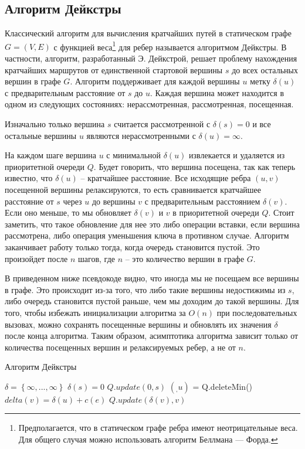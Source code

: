 \subsection{Алгоритм Дейкстры}
Классический алгоритм для вычисления кратчайших путей в статическом графе $G=(V, E)$ с функцией веса\footnote{Предполагается, что в статическом графе ребра имеют неотрицательные веса. Для общего случая можно использовать алгоритм Беллмана — Форда.} для ребер называется алгоритмом Дейкстры. В частности, алгоритм, разработанный Э. Дейкстрой, решает проблему нахождения кратчайших маршрутов от единственной стартовой вершины $s$ до всех остальных вершин в графе $G$. Алгоритм поддерживает для каждой вершины $u$ метку $\delta(u)$ с предварительным расстояние от $s$ до $u$. Каждая вершина может находится в одном из следующих состояниях: нерассмотренная, рассмотренная, посещенная. 

Изначально только вершина $s$ считается рассмотренной с $\delta(s)=0$ и все остальные вершины $u$ являются нерассмотренными с $\delta(u)=\infty$.

На каждом шаге вершина $u$ с минимальной $\delta(u)$ извлекается и удаляется из приоритетной очереди $Q$. Будет говорить, что вершина посещена, так как теперь известно, что $\delta(u)$ -- кратчайшее расстояние. Все исходящие ребра $(u, v)$ посещенной вершины релаксируются, то есть сравнивается кратчайшее расстояние от $s$ через $u$ до вершины $v$ с предварительным расстоянием $\delta(v)$. Если оно меньше, то мы обновляет $\delta(v)$ и $v$ в приоритетной очереди $Q$. Стоит заметить, что такое обновление для нее это либо операции вставки, если вершина рассмотрена, либо операция уменьшения ключа в противном случае. Алгоритм заканчивает работу только тогда, когда очередь становится пустой. Это произойдет после $n$ шагов, где $n$ -- это количество вершин в графе $G$.

В приведенном ниже псевдокоде видно, что иногда мы не посещаем все вершины в графе. Это происходит из-за того, что либо такие вершины недостижимы из $s$, либо очередь становится пустой раньше, чем мы доходим до такой вершины. Для того, чтобы избежать инициализации алгоритма за $O(n)$ при последовательных вызовах, можно сохранять посещенные вершины и обновлять их значения $\delta$ после конца алгоритма. Таким образом, асимптотика алгоритма зависит только от количества посещенных вершин и релаксируемых ребер, а не от $n$. 

\begin{algorithm}[!h]
	\caption{Алгоритм Дейкстры}\label{lst1}
	\begin{algorithmic}
		\State $\delta = \left\{\infty, ..., \infty\right\}$ 
		\State $\delta(s) = 0$ 
		\State $Q.update(0, s)$ 
			\State $(_, u)$ = Q.deleteMin() 
			 
					\State $delta(v) = \delta(u) + c(e)$
					\State $Q.update(\delta(v), v)$
				\EndIf
			\EndFor
		\EndWhile
		\EndFunction
	\end{algorithmic}
\end{algorithm}

